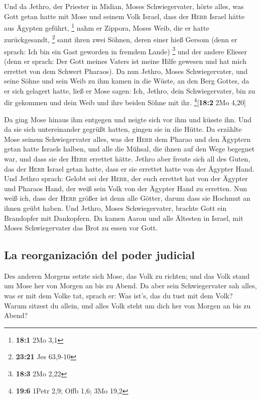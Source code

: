  Und da Jethro, der Priester in Midian, Moses
Schwiegervater, hörte alles, was Gott getan hatte mit Mose und seinem
Volk Israel, dass der \textsc{Herr} Israel hätte aus Ägypten geführt,
\footnote{\textbf{18:1} 2Mo 3,1}  nahm er Zippora, Moses
Weib, die er hatte zurückgesandt, \footnote{\textbf{23:21} Jes 63,9-10}
 samt ihren zwei Söhnen, deren einer hieß Gersom (denn er
sprach: Ich bin ein Gast geworden in fremdem Lande) \footnote{\textbf{18:3}
  2Mo 2,22}  und der andere Elieser (denn er sprach: Der
Gott meines Vaters ist meine Hilfe gewesen und hat mich errettet von dem
Schwert Pharaos).  Da nun Jethro, Moses Schwiegervater,
und seine Söhne und sein Weib zu ihm kamen in die Wüste, an den Berg
Gottes, da er sich gelagert hatte,  ließ er Mose sagen:
Ich, Jethro, dein Schwiegervater, bin zu dir gekommen und dein Weib und
ihre beiden Söhne mit ihr. \footnote{\textbf{19:6} 1Petr 2,9; Offb 1,6;
  3Mo 19,2}{[}\textbf{18:2} 2Mo 4,20{]}

 Da ging Mose hinaus ihm entgegen und neigte sich vor ihm
und küsste ihn. Und da sie sich untereinander gegrüßt hatten, gingen sie
in die Hütte.  Da erzählte Mose seinem Schwiegervater
alles, was der \textsc{Herr} dem Pharao und den Ägyptern getan hatte
Israels halben, und alle die Mühsal, die ihnen auf den Wege begegnet
war, und dass sie der \textsc{Herr} errettet hätte. 
Jethro aber freute sich all des Guten, das der \textsc{Herr} Israel
getan hatte, dass er sie errettet hatte von der Ägypter Hand.
 Und Jethro sprach: Gelobt sei der \textsc{Herr}, der
euch errettet hat von der Ägypter und Pharaos Hand, der weiß sein Volk
von der Ägypter Hand zu erretten.  Nun weiß ich, dass der
\textsc{Herr} größer ist denn alle Götter, darum dass sie Hochmut an
ihnen geübt haben.  Und Jethro, Moses Schwiegervater,
brachte Gott ein Brandopfer mit Dankopfern. Da kamen Aaron und alle
Ältesten in Israel, mit Moses Schwiegervater das Brot zu essen vor Gott.

\hypertarget{la-reorganizaciuxf3n-del-poder-judicial}{%
\subsection{La reorganización del poder
judicial}\label{la-reorganizaciuxf3n-del-poder-judicial}}

 Des anderen Morgens setzte sich Mose, das Volk zu
richten; und das Volk stand um Mose her von Morgen an bis zu Abend.
 Da aber sein Schwiegervater sah alles, was er mit dem
Volke tat, sprach er: Was ist's, das du tust mit dem Volk? Warum sitzest
du allein, und alles Volk steht um dich her von Morgen an bis zu Abend?

